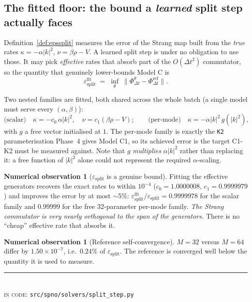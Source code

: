 \documentclass[11pt,a4paper]{article}
\theoremstyle{plain}
\theoremstyle{definition}
\newtheorem{observation}[theorem]{Numerical observation}
\theoremstyle{remark}
\newcommand{\dt}{\Delta t}
\newcommand{\epssplit}{\varepsilon_{\mathrm{split}}}
\newcommand{\Flow}{\Phi}
\newcommand{\code}[1]{\texttt{\small #1}}
\newcommand{\src}[1]{{\color{linknavy}\texttt{\footnotesize #1}}}
\newcommand{\sourcenote}[1]{%
  \par\vspace{0.35em}\noindent
  {\footnotesize\color{rulegray}\rule{\linewidth}{0.4pt}\\[0.25em]
  \textsc{in code:} \src{#1}}\par\vspace{0.5em}}
\begin{document}
\subsection{The fitted floor: the bound a \emph{learned} split step actually faces}
\label{sec:fittedfloor}

Definition~\ref{def:epssplit} measures the error of the Strang map built from the
\emph{true} rates $\kappa = -\alpha|k|^2$, $\nu = \beta\rho - V$. A learned split step is
under no obligation to use those. It may pick \emph{effective} rates that absorb part of
the $O(\dt^2)$ commutator, so the quantity that genuinely lower-bounds Model C is
\begin{equation}
\label{eq:fittedfloor}
\epssplit^{\mathrm{fit}}
\;=\;
\inf_{\theta}\;\bigl\|\Flow^\theta_{\dt} - \Flow^{\mathrm{ref}}_{\dt}\bigr\| .
\end{equation}

Two nested families are fitted, both shared across the whole batch (a single model must
serve every $(\alpha,\beta)$):
\[
\text{(scalar)}\quad \kappa = -c_0\,\alpha|k|^2,\quad \nu = c_1(\beta\rho - V);
\qquad
\text{(per-mode)}\quad \kappa = -\alpha|k|^2\,g(|k|^2),
\]
with $g$ a free vector initialised at $1$. The per-mode family is exactly the \code{K2}
parameterisation Phase~4 gives Model C1, so its achieved error is the target C1-K2 must
be measured against. Note that $g$ \emph{multiplies} $\alpha|k|^2$ rather than replacing
it: a free function of $|k|^2$ alone could not represent the required $\alpha$-scaling.

\begin{observation}[$\epssplit$ is a genuine bound]
\label{obs:floor}
Fitting the effective generators recovers the exact rates to within $10^{-4}$
($c_0 = 1.0000008$, $c_1 = 0.9999979$) and improves the error by at most $\sim$5\%:
$\epssplit^{\mathrm{fit}}/\epssplit = 0.9999978$ for the scalar family and $0.99999$ for
the free 32-parameter per-mode family. \emph{The Strang commutator is very nearly
orthogonal to the span of the generators.} There is no ``cheap'' effective rate that
absorbs it.
\end{observation}

\begin{observation}[Reference self-convergence]
$M{=}32$ versus $M{=}64$ differ by $1.50\times10^{-7}$, i.e.\ $0.24\%$ of $\epssplit$.
The reference is converged well below the quantity it is used to measure.
\end{observation}

\sourcenote{src/spno/solvers/split\_step.py}
\newpage
\end{document}

